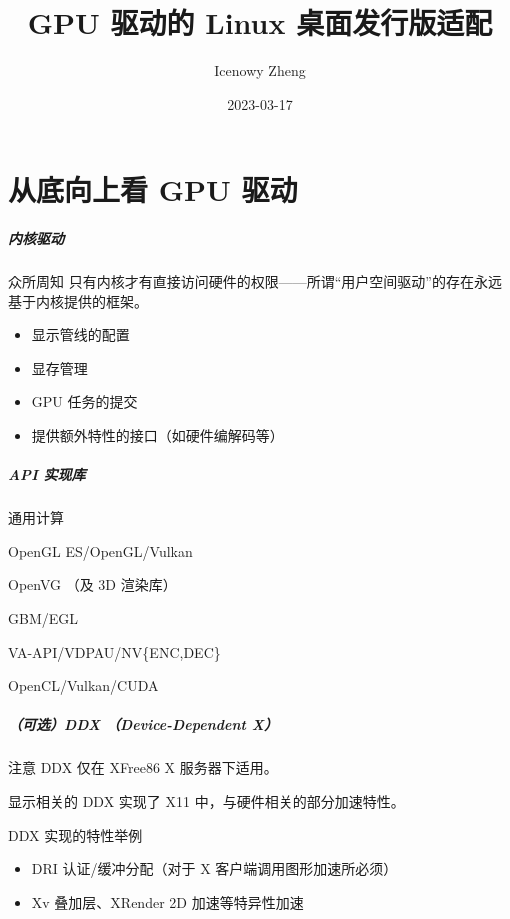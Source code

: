 \documentclass{ctexbeamer}
\title{GPU 驱动的 Linux 桌面发行版适配}
\author{Icenowy Zheng}
\institute{PLCT 实验室}
\date{2023-03-17}
\begin{document}
\frame{\titlepage}

\part{从底向上看 GPU 驱动}
\frame{\partpage}

\begin{frame}
    \frametitle{内核驱动}
    \begin{block}{众所周知}
        只有内核才有直接访问硬件的权限——所谓“用户空间驱动”的存在永远基于内核提供的框架。
    \end{block}
    \begin{itemize}
        \item 显示管线的配置
        \item 显存管理
        \item GPU 任务的提交
        \item 提供额外特性的接口（如硬件编解码等）
    \end{itemize}
\end{frame}

\begin{frame}
    \frametitle{API 实现库}
    \begin{labeling}{通用计算}
        \item [3D 渲染] OpenGL ES/OpenGL/Vulkan
        \item [2D 渲染] OpenVG （及 3D 渲染库）
        \item [资源管理] GBM/EGL
        \item [硬件解码] VA-API/VDPAU/NV\{ENC,DEC\}
        \item [通用计算] OpenCL/Vulkan/CUDA
    \end{labeling}
\end{frame}

\begin{frame}
    \frametitle{（可选）DDX （Device-Dependent X）}
    \begin{alertblock}{注意}
        DDX 仅在 XFree86 X 服务器下适用。
    \end{alertblock}
    显示相关的 DDX 实现了 X11 中，与硬件相关的部分加速特性。
    \begin{block}{DDX 实现的特性举例}
        \begin{itemize}
            \item DRI 认证/缓冲分配（对于 X 客户端调用图形加速所必须）
            \item Xv 叠加层、XRender 2D 加速等特异性加速
        \end{itemize}
    \end{block}
\end{frame}
\end{document}
